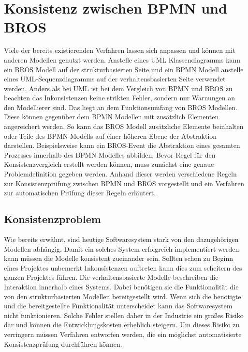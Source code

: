 \chapter{Konsistenz zwischen BPMN und BROS}
\label{chap:consistency}

Viele der bereits existierenden Verfahren lassen sich anpassen und können mit anderen Modellen genutzt werden. 
Anstelle eines UML Klassendiagramms kann ein BROS Modell auf der strukturbasierten Seite und ein BPMN Modell anstelle eines UML-Sequenzdiagramms auf der verhaltensbasierten Seite verwendet werden.
Anders als bei UML ist bei dem Vergleich von BPMN und BROS zu beachten das Inkonsistenzen keine strikten Fehler, sondern nur Warnungen an den Modellierer sind.
Das liegt an dem Funktionsumfang von BROS Modellen.
Diese können gegenüber dem BPMN Modellen mit zusätzlich Elementen angereichert werden.
So kann das BROS Modell zusätzliche Elemente beinhalten oder Teile des BPMN Modells auf einer höheren Ebene der Abstraktion darstellen.
Beispielsweise kann ein BROS-Event die Abstraktion eines gesamten Prozesses innerhalb des BPMN Modelles abbilden.
Bevor Regel für den Konsistenzvergleich erstellt werden können, muss zunächst eine genaue Problemdefinition gegeben werden.
Anhand dieser werden verschiedene Regeln zur Konsistenzprüfung zwischen BPMN und BROS vorgestellt und ein Verfahren zur automatischen Prüfung dieser Regeln erläutert.

\section{Konsistenzproblem}

Wie bereits erwähnt, sind heutige Softwaresystem stark von den dazugehörigen Modellen abhängig.
Damit ein solches System erfolgreich implementiert werden kann müssen die Modelle konsistent zueinander sein.
Sollten schon zu Beginn eines Projektes unbemerkt Inkonsistenzen auftreten kann dies zum scheitern des ganzen Projektes führen.
Die verhaltensbasierte Modelle beschreiben die Interaktion innerhalb eines Systems.
Dabei benötigen sie die Funktionalität die von den strukturbasierten Modellen bereitgestellt wird.
Wenn sich die benötigte und die bereitgestellte Funktionalität unterscheidet kann das Softwaresystem nicht funktionieren.
Solche Fehler stellen daher in der Industrie ein großes Risiko dar und können die Entwicklungskosten erheblich steigern.
Um dieses Risiko zu verringern müssen Verfahren entworfen werden, die ein möglichst automatisierte Konsistenzprüfung durchführen können.

